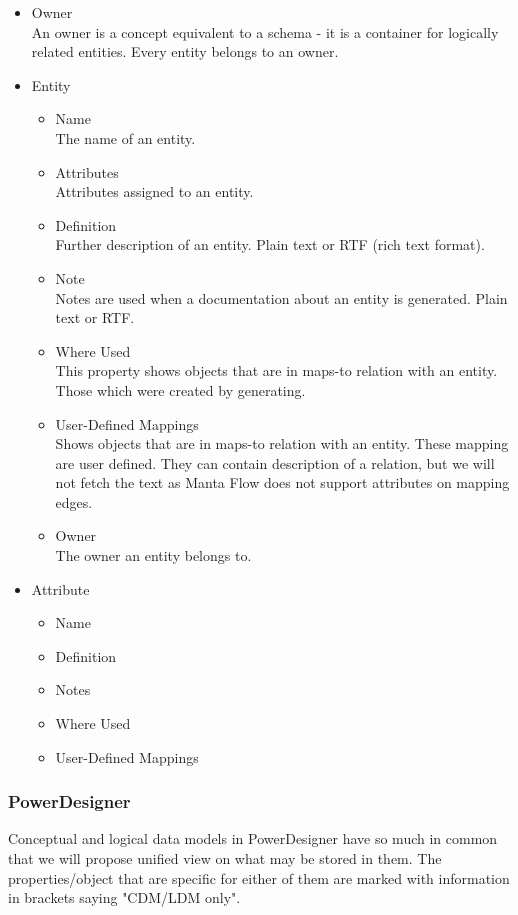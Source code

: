 \begin{itemize}
	\item Owner \\ 
	An owner is a concept equivalent to a schema - it is a container for logically related entities. Every entity belongs to an owner.
	\item Entity \\
	\begin{itemize}
		\item Name \\ 
		The name of an entity.
		\item Attributes \\ 
		Attributes assigned to an entity.
		\item Definition \\
		Further description of an entity. Plain text or RTF (rich text format).
		\item Note \\
		Notes are used when a documentation about an entity is generated. Plain text or RTF.
		\item Where Used \\
		This property shows objects that are in maps-to relation with an entity. Those which were created by generating.
		\item User-Defined Mappings \\
		Shows objects that are in maps-to relation with an entity. These mapping are user defined. They can contain description of a relation, but we will not fetch the text as Manta Flow does not support attributes on mapping edges.
		\item Owner \\ 
		The owner an entity belongs to.
	\end{itemize}
	\item Attribute
	\begin{itemize}
		\item Name
		\item Definition
		\item Notes
		\item Where Used
		\item User-Defined Mappings
	\end{itemize}
\end{itemize}


\subsubsection{PowerDesigner}

Conceptual and logical data models in PowerDesigner have so much in common that we will propose unified view on what may be stored in them. The properties/object that are specific for either of them are marked with information in brackets saying "CDM/LDM only".

